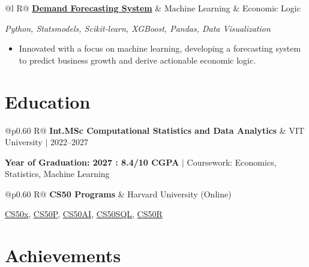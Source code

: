 \documentclass[a4paper,10pt]{article}
\newcommand{\ulink}[2]{\href{#1}{#2}}
\newcommand{\subheading}[1]{{\color[HTML]{0A0A0A}\fontsize{12}{14}\selectfont\bfseries #1}}
\newcommand{\techstack}[1]{{\color[HTML]{5C5C5C}\fontsize{10.5}{12.5}\selectfont\itshape #1}}
\newcommand{\meta}[1]{{\color[HTML]{5C5C5C}\fontsize{10.5}{12.5}\selectfont #1}}
\begin{document}
\begin{tabularx}{\linewidth}{@{}l R@{}}
\subheading{\ulink{https://github.com/su-jin1425/Demand-Forecasting-System}{Demand Forecasting System}} & \meta{Machine Learning \& Economic Logic}
\end{tabularx}
\techstack{Python, Statsmodels, Scikit-learn, XGBoost, Pandas, Data Visualization}
\begin{itemize}[nosep, leftmargin=1.5em, itemsep=2pt, topsep=2pt]
  \item {\color[HTML]{0A0A0A}\fontsize{11}{14}\selectfont Innovated with a focus on machine learning, developing a forecasting system to predict business growth and derive actionable economic logic.}
\end{itemize}

\section{Education}
\vspace{2pt}

\begin{tabularx}{\linewidth}{@{}p{0.60\linewidth} R@{}}
\subheading{Int.MSc Computational Statistics and Data Analytics} & \meta{VIT University $|$ 2022--2027}
\end{tabularx}
{\color[HTML]{3A3A3A}\fontsize{11}{14}\selectfont \textbf{Year of Graduation: 2027 : 8.4/10 CGPA} $|$ Coursework: Economics, Statistics, Machine Learning}

\begin{tabularx}{\linewidth}{@{}p{0.60\linewidth} R@{}}
\subheading{CS50 Programs} & \meta{Harvard University (Online)}
\end{tabularx}
{\color[HTML]{3A3A3A}\fontsize{11}{14}\selectfont \ulink{https://cs50.harvard.edu/certificates/b14b78df-e05c-413e-a607-1dd27303053a}{CS50x}, \ulink{https://cs50.harvard.edu/certificates/32477052-9db4-49c4-a5a4-d7e58429ca2c}{CS50P}, \ulink{https://cs50.harvard.edu/certificates/9cdb4d4a-1250-4f8e-9fd7-191864e0f919}{CS50AI}, \ulink{https://cs50.harvard.edu/certificates/bc486f24-f085-4e61-8536-80940b97a1b9}{CS50SQL}, \ulink{https://cs50.harvard.edu/certificates/666838e6-a053-4d82-b179-a60fe745fd84}{CS50R}}

\section{Achievements}
\vspace{2pt}
\end{document}
